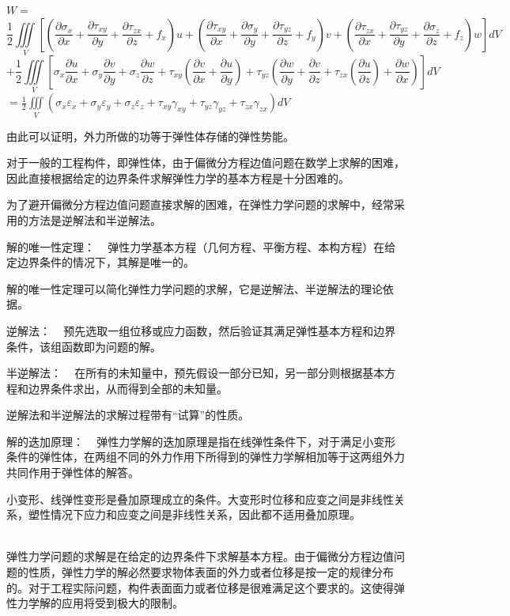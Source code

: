 \documentclass[12pt,a4paper]{article}
\begin{document}
$W=$
$$
\frac{1}{2}\iiint\limits_V \left[(\frac{\partial \sigma_x}{\partial x}+\frac{\partial \tau_{xy}}{\partial y}+\frac{\partial \tau_{zx}}{\partial z}+f_x)u+(\frac{\partial \tau_{xy}}{\partial x}+\frac{\partial \sigma_y}{\partial y}+\frac{\partial \tau_{yz}}{\partial z}+f_y)v+(\frac{\partial \tau_{zx}}{\partial x}+\frac{\partial \tau_{yz}}{\partial y}+\frac{\partial \sigma_z}{\partial z}+f_z)w\right]dV
$$
$$
+ \frac{1}{2}\iiint\limits_V \left[\sigma_x\frac{\partial u}{\partial x}+\sigma_y\frac{\partial v}{\partial y}+\sigma_z\frac{\partial w}{\partial z}+\tau_{xy}(\frac{\partial v}{\partial x}+\frac{\partial u}{\partial y})+\tau_{yz}(\frac{\partial w}{\partial y}+\frac{\partial v}{\partial z}+\tau_{zx}(\frac{\partial u}{\partial z})+\frac{\partial w}{\partial x})\right]dV
$$
$
= \frac{1}{2}\iiint\limits_V (\sigma_x\varepsilon_x+\sigma_y\varepsilon_y+\sigma_z\varepsilon_z+\tau_{xy}\gamma_{xy}+\tau_{yz}\gamma_{yz}+\tau_{zx}\gamma_{zx})dV
$

由此可以证明，外力所做的功等于弹性体存储的弹性势能。

对于一般的工程构件，即弹性体，由于偏微分方程边值问题在数学上求解的困难，因此直接根据给定的边界条件求解弹性力学的基本方程是十分困难的。

为了避开偏微分方程边值问题直接求解的困难，在弹性力学问题的求解中，经常采用的方法是逆解法和半逆解法。

解的唯一性定理： ~ 弹性力学基本方程（几何方程、平衡方程、本构方程）在给定边界条件的情况下，其解是唯一的。

解的唯一性定理可以简化弹性力学问题的求解，它是逆解法、半逆解法的理论依据。

逆解法： ~ 预先选取一组位移或应力函数，然后验证其满足弹性基本方程和边界条件，该组函数即为问题的解。

半逆解法： ~ 在所有的未知量中，预先假设一部分已知，另一部分则根据基本方程和边界条件求出，从而得到全部的未知量。

逆解法和半逆解法的求解过程带有“试算”的性质。

解的迭加原理： ~ 弹性力学解的迭加原理是指在线弹性条件下，对于满足小变形条件的弹性体，在两组不同的外力作用下所得到的弹性力学解相加等于这两组外力共同作用于弹性体的解答。

小变形、线弹性变形是叠加原理成立的条件。大变形时位移和应变之间是非线性关系，塑性情况下应力和应变之间是非线性关系，因此都不适用叠加原理。

~ \\

弹性力学问题的求解是在给定的边界条件下求解基本方程。由于偏微分方程边值问题的性质，弹性力学的解必然要求物体表面的外力或者位移是按一定的规律分布的。对于工程实际问题，构件表面面力或者位移是很难满足这个要求的。这使得弹性力学解的应用将受到极大的限制。
\end{document}
